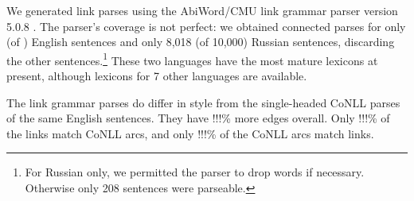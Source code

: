 \documentclass[11pt]{article}
\newcommand{\Note}[4][]{\todo[author=#2,color=#3,fancyline,#1]{#4}}
\newcommand{\noteJE}[2][]{\Note[#1]{JE}{green!40}{#2}}
\newcommand{\NoteJE}[2][]{\noteJE[inline,#1]{#2}}
\begin{document}
We generated link parses using the AbiWord/CMU link grammar parser version 5.0.8 \cite{LINKPARSER-2014}.  The parser's coverage is not perfect: we obtained connected parses for only (of $\!\!$) English sentences and only 8,018 (of 10,000) Russian sentences, discarding the other sentences.\footnote{For Russian only, we permitted the parser to drop words if necessary.  Otherwise only 208 sentences were parseable.}
These two languages have the most mature lexicons at present, although lexicons for 7 other languages are available.  

The link grammar parses do differ in style from the single-headed CoNLL parses of the same English sentences.  They have !!!\% more edges overall.  Only !!!\% of the links match CoNLL arcs, and only !!!\% of the CoNLL arcs match links.
%   
% 





\end{document}
